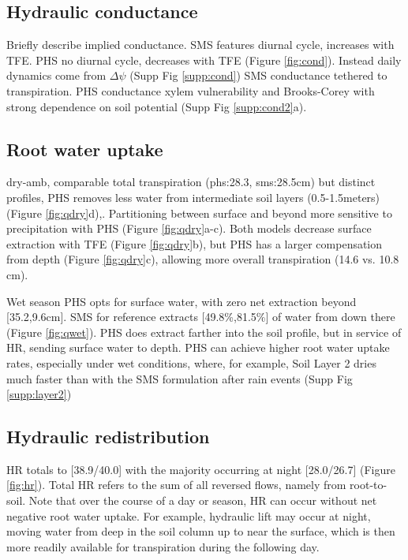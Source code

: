 \documentclass[draft,linenumbers]{agujournal}
\begin{document}
    
\subsection{Hydraulic conductance}
    Briefly describe implied conductance.
    SMS features diurnal cycle, increases with TFE.
    PHS no diurnal cycle, decreases with TFE (Figure \ref{fig:cond}).
    Instead daily dynamics come from $\Delta \psi$ (Supp Fig \ref{supp:cond})
    SMS conductance tethered to transpiration.
    PHS conductance xylem vulnerability and Brooks-Corey with strong dependence on soil potential (Supp Fig \ref{supp:cond2}a).

\subsection{Root water uptake}
    dry-amb, comparable total transpiration (phs:28.3, sms:28.5cm)  but distinct profiles, PHS removes less water from intermediate soil layers (0.5-1.5meters) (Figure \ref{fig:qdry}d),.
    Partitioning between surface and beyond more sensitive to precipitation with PHS (Figure \ref{fig:qdry}a-c).
    Both models decrease surface extraction with TFE (Figure \ref{fig:qdry}b), but PHS has a larger compensation from depth (Figure \ref{fig:qdry}c),
    allowing more overall transpiration (14.6 vs. 10.8 cm).
    
    Wet season PHS opts for surface water, with zero net extraction beyond [35.2,9.6cm].
    SMS for reference extracts [49.8\%,81.5\%] of water from down there (Figure \ref{fig:qwet}). 
    PHS does extract farther into the soil profile, but in service of HR, 
    sending surface water to depth.
    PHS can achieve higher root water uptake rates, especially under wet conditions, where, for example, 
    Soil Layer 2 dries much faster than with the SMS formulation after rain events (Supp Fig \ref{supp:layer2})
        
\subsection{Hydraulic redistribution}
    HR totals to [38.9/40.0] with the majority occurring at night [28.0/26.7] (Figure \ref{fig:hr}).
    Total HR refers to the sum of all reversed flows, namely from root-to-soil.
    Note that over the course of a day or season, HR can occur without net negative root water uptake.
    For example, hydraulic lift may occur at night, moving water from deep in the soil column up to near the surface, which is then more readily available for transpiration during the following day.    
\end{document}

